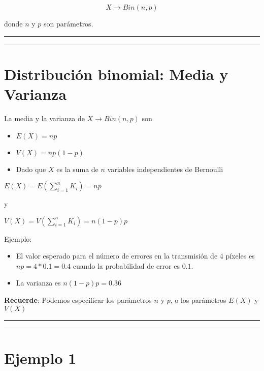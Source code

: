 \documentclass[
]{book}
\begin{document}
\[X\rightarrow Bin(n,p)\]

donde \(n\) y \(p\) son parámetros.

\begin{center}\rule{0.5\linewidth}{0.5pt}\end{center}

\begin{center}\rule{0.5\linewidth}{0.5pt}\end{center}

\hypertarget{distribuciuxf3n-binomial-media-y-varianza}{%
\section{Distribución binomial: Media y Varianza}\label{distribuciuxf3n-binomial-media-y-varianza}}

La media y la varianza de \(X\rightarrow Bin(n,p)\) son

\begin{itemize}
\item
  \(E(X)=np\)
\item
  \(V(X)=np(1-p)\)
\item
  Dado que \(X\) es la suma de \(n\) variables independientes de Bernoulli
\end{itemize}

\(E(X)=E(\sum_{i=1}^n K_i)=np\)

y

\(V(X)=V(\sum_{i=1}^n K_i)=n(1-p)p\)

Ejemplo:

\begin{itemize}
\item
  El valor esperado para el número de errores en la transmisión de 4 píxeles es \(np=4*0.1=0.4\) cuando la probabilidad de error es \(0.1\).
\item
  La varianza es \(n(1-p)p=0.36\)
\end{itemize}

\textbf{Recuerde}: Podemos especificar los parámetros \(n\) y \(p\), o los parámetros \(E(X)\) y \(V(X)\)

\begin{center}\rule{0.5\linewidth}{0.5pt}\end{center}

\begin{center}\rule{0.5\linewidth}{0.5pt}\end{center}

\hypertarget{ejemplo-1-1}{%
\section{Ejemplo 1}\label{ejemplo-1-1}}
\end{document}
